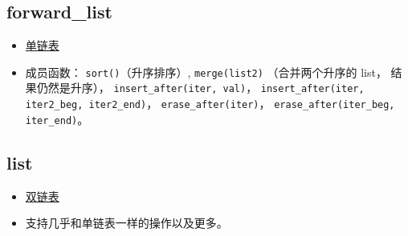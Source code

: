 \subsection{forward\_list}
\begin{itemize}
\item \href{https://cplusplus.com/reference/forward_list/forward_list/}{单链表}
\item 成员函数： \verb|sort()|（升序排序）, \verb|merge(list2)| （合并两个升序的 list， 结果仍然是升序）， \verb|insert_after(iter, val)|，  \verb|insert_after(iter, iter2_beg, iter2_end)|， \verb|erase_after(iter)|， \verb|erase_after(iter_beg, iter_end)|。
\end{itemize}

\subsection{list}
\begin{itemize}
\item \href{https://cplusplus.com/reference/list/list/}{双链表}
\item 支持几乎和单链表一样的操作以及更多。
\end{itemize}
